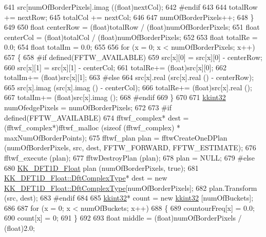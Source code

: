 \begin{DoxyCode}
641       src[numOfBorderPixels].imag ((\textcolor{keywordtype}{float})nextCol);
642 \textcolor{preprocessor}{    #endif}
643 
644     totalRow += nextRow;
645     totalCol += nextCol;
646 
647     numOfBorderPixels++;
648   \}
649 
650   \textcolor{keywordtype}{float}  centerRow = (float)totalRow / (\textcolor{keywordtype}{float})numOfBorderPixels;
651   \textcolor{keywordtype}{float}  centerCol = (float)totalCol / (\textcolor{keywordtype}{float})numOfBorderPixels;
652 
653   \textcolor{keywordtype}{float}  totalRe = 0.0;
654   \textcolor{keywordtype}{float}  totalIm = 0.0;
655 
656   \textcolor{keywordflow}{for}  (x = 0;  x < numOfBorderPixels;  x++)
657   \{
658 \textcolor{preprocessor}{    #if  defined(FFTW\_AVAILABLE)}
659       src[x][0] = src[x][0] - centerRow;
660       src[x][1] = src[x][1] - centerCol;
661       totalRe+= (float)src[x][0];
662       totalIm+= (float)src[x][1];
663 \textcolor{preprocessor}{    #else}
664       src[x].real (src[x].real () - centerRow);
665       src[x].imag (src[x].imag () - centerCol);
666       totalRe+= (float)src[x].real ();
667       totalIm+= (float)src[x].imag ();
668 \textcolor{preprocessor}{    #endif}
669   \}
670 
671   \hyperlink{namespace_k_k_b_a8fa4952cc84fda1de4bec1fbdd8d5b1b}{kkint32}  numOfedgePixels = numOfBorderPixels;
672 
673 \textcolor{preprocessor}{  #if  defined(FFTW\_AVAILABLE)}
674     fftwf\_complex*  dest = (fftwf\_complex*)fftwf\_malloc (\textcolor{keyword}{sizeof} (fftwf\_complex) * maxNumOfBorderPoints);
675     fftwf\_plan plan = fftwCreateOneDPlan (numOfBorderPixels, src, dest, FFTW\_FORWARD, FFTW\_ESTIMATE);
676     fftwf\_execute (plan);
677     fftwDestroyPlan (plan);
678     plan = NULL;
679 \textcolor{preprocessor}{  #else}
680     \hyperlink{class_k_k_b_1_1_k_k___d_f_t1_d}{KK\_DFT1D\_Float}  plan (numOfBorderPixels, \textcolor{keyword}{true});
681     \hyperlink{class_k_k_b_1_1_k_k___d_f_t1_d_a4cbc827157dd30ddec2d3753e552a827}{KK\_DFT1D\_Float::DftComplexType}*  dest = \textcolor{keyword}{new} 
      \hyperlink{class_k_k_b_1_1_k_k___d_f_t1_d_a4cbc827157dd30ddec2d3753e552a827}{KK\_DFT1D\_Float::DftComplexType}[numOfBorderPixels];
682     plan.Transform (src, dest);
683 \textcolor{preprocessor}{  #endif}
684 
685   \hyperlink{namespace_k_k_b_a8fa4952cc84fda1de4bec1fbdd8d5b1b}{kkint32}*  count = \textcolor{keyword}{new} \hyperlink{namespace_k_k_b_a8fa4952cc84fda1de4bec1fbdd8d5b1b}{kkint32} [numOfBuckets];
686 
687   \textcolor{keywordflow}{for}  (x = 0; x < numOfBuckets; x++)
688   \{
689     countourFreq[x] = 0.0;
690     count[x] = 0;
691   \}
692 
693   \textcolor{keywordtype}{float}  middle = (float)numOfBorderPixels / (\textcolor{keywordtype}{float})2.0;

\end{DoxyCode}
